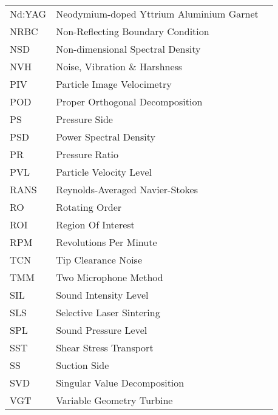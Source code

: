\begin{longtable}{lll}
Nd:YAG & Neodymium-doped Yttrium Aluminium Garnet\\
NRBC & Non-Reflecting Boundary Condition \\
NSD & Non-dimensional Spectral Density \\
NVH & Noise, Vibration \& Harshness \\
PIV & Particle Image Velocimetry \\
POD & Proper Orthogonal Decomposition \\
PS & Pressure Side \\
PSD & Power Spectral Density \\
PR & Pressure Ratio \\
PVL & Particle Velocity Level \\
RANS & Reynolds-Averaged Navier-Stokes \\
RO & Rotating Order \\
ROI & Region Of Interest \\
RPM & Revolutions Per Minute \\
TCN & Tip Clearance Noise \\
TMM & Two Microphone Method \\
SIL & Sound Intensity Level \\
SLS & Selective Laser Sintering \\
SPL & Sound Pressure Level \\
SST & Shear Stress Transport \\
SS & Suction Side \\
SVD & Singular Value Decomposition \\
VGT & Variable Geometry Turbine \\
\end{longtable}

\normalsize